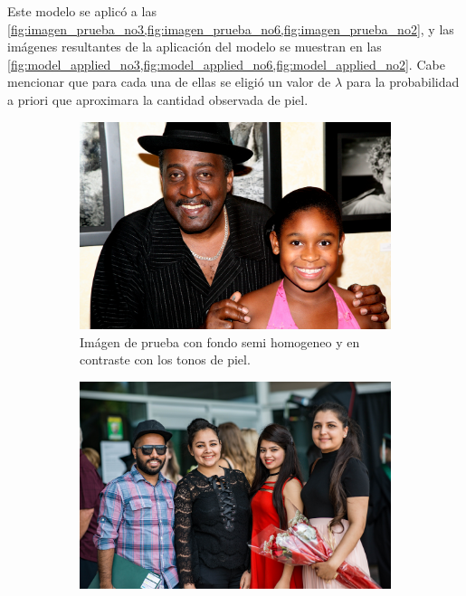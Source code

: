 Este modelo se aplicó a las \cref{fig:imagen_prueba_no3,fig:imagen_prueba_no6,fig:imagen_prueba_no2}, y las imágenes resultantes de la aplicación del modelo se muestran en las \cref{fig:model_applied_no3,fig:model_applied_no6,fig:model_applied_no2}. Cabe mencionar que para cada una de ellas se eligió un valor de $\lambda$ para la probabilidad a priori que aproximara la cantidad observada de piel.
\begin{figure}[ht!]
    \centering
    \begin{subfigure}[t]{0.4\textwidth}
        \centering
        \includegraphics[width=\textwidth]{../figures/image3/image_03.png}
        \caption{Imágen de prueba con fondo semi homogeneo y en contraste con los tonos de piel.}
        \label{fig:imagen_prueba_no3}
    \end{subfigure}
    \hspace{1cm}
    \begin{subfigure}[t]{0.4\textwidth}
        \centering
        \includegraphics[width=\textwidth]{../figures/image6/image_06.png}

\end{subfigure}
\end{figure}
